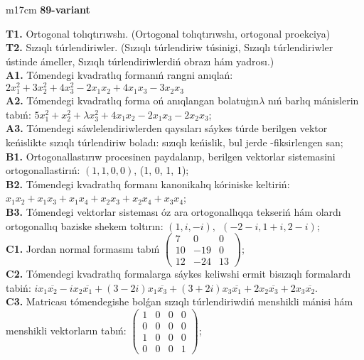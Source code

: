 \documentclass{article}
\begin{document}
\begin{tabular}{m{17cm}}
\textbf{89-variant}
\newline

\textbf{T1.} Ortogonal  tolıqtırıwshı. (Ortogonal tolıqtırıwshı,  ortogonal proekciya) \\
\textbf{T2.} Sızıqlı túrlendiriwler.  (Sızıqlı túrlendiriw túsinigi, Sızıqlı túrlendiriwler ústinde ámeller, Sızıqlı túrlendiriwlerdiń obrazı hám yadrosı.) \\
\textbf{A1.} Tómendegi kvadratlıq formanıń rangni anıqlań: \(2x_{1}^{2} + 3x_{2}^{2} + 4x_{3}^{2} - 2x_{1}x_{2} + 4x_{1}x_{3} - 3x_{2}x_{3}\) \\
\textbf{A2.} Tómendegi kvadratlıq forma oń anıqlangan bolatuģın\(\lambda\) nıń barlıq mánislerin tabıń: \(5x_{1}^{2} + x_{2}^{2} + \lambda x_{3}^{2} + 4x_{1}x_{2} - 2x_{1}x_{3} - 2x_{2}x_{3}\); \\
\textbf{A3.} Tómendegi sáwlelendiriwlerden qaysıları sáykes túrde berilgen vektor keńislikte sızıqlı túrlendiriw boladı: sızıqlı keńislik, bul jerde -fiksirlengen san; \\
\textbf{B1.} Ortogonallastırıw procesinen paydalanıp, berilgen vektorlar sistemasini ortogonallastirıń: \((1,1,0,0)\), (1, 0, 1, 1); \\
\textbf{B2.} Tómendegi kvadratlıq formanı kanonikalıq kóriniske keltiriń: \(x_{1}x_{2} + x_{1}x_{3} + x_{1}x_{4} + x_{2}x_{3} + x_{2}x_{4} + x_{3}x_{4}\); \\
\textbf{B3.} Tómendegi vektorlar sisteması óz ara ortogonallıqqa tekseriń hám olardı ortogonallıq baziske shekem toltırın: \((1,i, - i),\ \ ( - 2 - i,1 + i,2 - i)\); \\
\textbf{C1.} Jordan normal formasını tabıń \(\begin{pmatrix} 7 & 0 & 0 \\ 10 & - 19 & 0 \\ 12 & - 24 & 13 \end{pmatrix}\); \\
\textbf{C2.} Tómendegi kvadratlıq formalarga sáykes keliwshi ermit bisızıqlı formalardı tabiń: \(ix_{1}\overline{x_{2}} - ix_{2}\overline{x_{1}} + (3 - 2i)x_{1}\overline{x_{3}} + (3 + 2i)x_{3}\overline{x_{1}} + 2x_{2}\overline{x_{3}} + 2x_{3}\overline{x_{2}}\). \\
\textbf{C3.} Matricası tómendegishe bolǵan sızıqlı túrlendiriwdiń menshikli mánisi hám menshikli vektorların tabıń: \(\begin{pmatrix} 1 & 0 & 0 & 0 \\ 0 & 0 & 0 & 0 \\ 1 & 0 & 0 & 0 \\ 0 & 0 & 0 & 1 \end{pmatrix}\); \\

\end{tabular}
\vspace{1cm}
\end{document}
